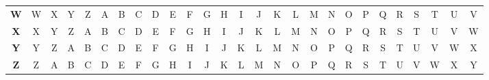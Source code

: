 \documentclass{article}
\begin{document}
\begin{latin}
\begin{table}[H]
{\begin{tabular}{ccccccccccccccccccccccccccc}
\multicolumn{1}{c|}{\textbf{W}} & \multicolumn{1}{c|}{W} & \multicolumn{1}{c|}{X} & \multicolumn{1}{c|}{Y} & \multicolumn{1}{c|}{Z} & \multicolumn{1}{c|}{A} & \multicolumn{1}{c|}{B} & \multicolumn{1}{c|}{C} & \multicolumn{1}{c|}{D} & \multicolumn{1}{c|}{E} & \multicolumn{1}{c|}{F} & \multicolumn{1}{c|}{G} & \multicolumn{1}{c|}{H} & \multicolumn{1}{c|}{I} & \multicolumn{1}{c|}{J} & \multicolumn{1}{c|}{K} & \multicolumn{1}{c|}{L} & \multicolumn{1}{c|}{M} & \multicolumn{1}{c|}{N} & \multicolumn{1}{c|}{O} & \multicolumn{1}{c|}{P} & \multicolumn{1}{c|}{Q} & \multicolumn{1}{c|}{R} & \multicolumn{1}{c|}{S} & \multicolumn{1}{c|}{T} & \multicolumn{1}{c|}{U} & \multicolumn{1}{c|}{V} \\ \cline{2-27} 
\multicolumn{1}{c|}{\textbf{X}} & \multicolumn{1}{c|}{X} & \multicolumn{1}{c|}{Y} & \multicolumn{1}{c|}{Z} & \multicolumn{1}{c|}{A} & \multicolumn{1}{c|}{B} & \multicolumn{1}{c|}{C} & \multicolumn{1}{c|}{D} & \multicolumn{1}{c|}{E} & \multicolumn{1}{c|}{F} & \multicolumn{1}{c|}{G} & \multicolumn{1}{c|}{H} & \multicolumn{1}{c|}{I} & \multicolumn{1}{c|}{J} & \multicolumn{1}{c|}{K} & \multicolumn{1}{c|}{L} & \multicolumn{1}{c|}{M} & \multicolumn{1}{c|}{N} & \multicolumn{1}{c|}{O} & \multicolumn{1}{c|}{P} & \multicolumn{1}{c|}{Q} & \multicolumn{1}{c|}{R} & \multicolumn{1}{c|}{S} & \multicolumn{1}{c|}{T} & \multicolumn{1}{c|}{U} & \multicolumn{1}{c|}{V} & \multicolumn{1}{c|}{W} \\ \cline{2-27} 
\multicolumn{1}{c|}{\textbf{Y}} & \multicolumn{1}{c|}{Y} & \multicolumn{1}{c|}{Z} & \multicolumn{1}{c|}{A} & \multicolumn{1}{c|}{B} & \multicolumn{1}{c|}{C} & \multicolumn{1}{c|}{D} & \multicolumn{1}{c|}{E} & \multicolumn{1}{c|}{F} & \multicolumn{1}{c|}{G} & \multicolumn{1}{c|}{H} & \multicolumn{1}{c|}{I} & \multicolumn{1}{c|}{J} & \multicolumn{1}{c|}{K} & \multicolumn{1}{c|}{L} & \multicolumn{1}{c|}{M} & \multicolumn{1}{c|}{N} & \multicolumn{1}{c|}{O} & \multicolumn{1}{c|}{P} & \multicolumn{1}{c|}{Q} & \multicolumn{1}{c|}{R} & \multicolumn{1}{c|}{S} & \multicolumn{1}{c|}{T} & \multicolumn{1}{c|}{U} & \multicolumn{1}{c|}{V} & \multicolumn{1}{c|}{W} & \multicolumn{1}{c|}{X} \\ \cline{2-27} 
\multicolumn{1}{c|}{\textbf{Z}} & \multicolumn{1}{c|}{Z} & \multicolumn{1}{c|}{A} & \multicolumn{1}{c|}{B} & \multicolumn{1}{c|}{C} & \multicolumn{1}{c|}{D} & \multicolumn{1}{c|}{E} & \multicolumn{1}{c|}{F} & \multicolumn{1}{c|}{G} & \multicolumn{1}{c|}{H} & \multicolumn{1}{c|}{I} & \multicolumn{1}{c|}{J} & \multicolumn{1}{c|}{K} & \multicolumn{1}{c|}{L} & \multicolumn{1}{c|}{M} & \multicolumn{1}{c|}{N} & \multicolumn{1}{c|}{O} & \multicolumn{1}{c|}{P} & \multicolumn{1}{c|}{Q} & \multicolumn{1}{c|}{R} & \multicolumn{1}{c|}{S} & \multicolumn{1}{c|}{T} & \multicolumn{1}{c|}{U} & \multicolumn{1}{c|}{V} & \multicolumn{1}{c|}{W} & \multicolumn{1}{c|}{X} & \multicolumn{1}{c|}{Y} \\ \cline{2-27} 
\end{tabular}%
}
\end{table}
\end{latin}
\end{document}
